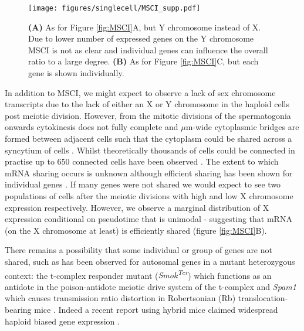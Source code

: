\begin{figure}[H]
	\centering
	\texttt{[image: figures/singlecell/MSCI\_supp.pdf]}
	\caption[MSCI Supplement]{
		\textbf{(A)} As for Figure \ref{fig:MSCI}A, but Y chromosome instead of X. Due to lower number of expressed genes on the Y chromosome MSCI is not as clear and individual genes can influence the overall ratio to a large degree.
		\textbf{(B)} As for Figure \ref{fig:MSCI}C, but each gene is shown individually.}
	\label{fig:MSCI_supp}
\end{figure}


In addition to MSCI, we might expect to observe a lack of sex chromosome transcripts due to the lack of either an X or Y chromosome in the haploid cells post meiotic division. However, from the mitotic divisions of the spermatogonia onwards cytokinesis does not fully complete and $\mu$m-wide cytoplasmic bridges are formed between adjacent cells such that the cytoplasm could be shared across a syncytium of cells \parencite{Greenbaum2011Germ}. Whilst theoretically thousands of cells could be connected in practise up to 650 connected cells have been observed \parencite{Ren1991Clonal}. The extent to which mRNA sharing occurs is unknown although efficient sharing has been shown for individual genes \parencite{Braun1989Genetically}. If many genes were not shared we would expect to see two populations of cells after the meiotic divisions with high and low X chromosome expression respectively. However, we observe a marginal distribution of X expression conditional on pseudotime that is unimodal - suggesting that mRNA (on the X chromosome at least) is efficiently shared (figure \ref{fig:MSCI}B).

There remains a possibility that some individual or group of genes are not shared, such as has been observed for autosomal genes in a mutant heterozygous context: the t-complex responder mutant (\textit{Smok\textsuperscript{Tcr}}) which functions as an antidote in the poison-antidote meiotic drive system of the t-complex \parencite{Herrmann1999protein, Veron2009Retention} and \textit{Spam1} which causes transmission ratio distortion in Robertsonian (Rb) translocation-bearing mice \parencite{Martin-DeLeon2005Spam1associated}. Indeed a recent report using hybrid mice claimed widespread haploid biased gene expression \parencite{Bhutani2019Widespread}.


